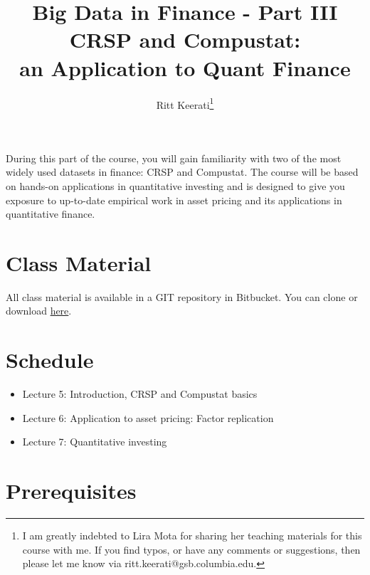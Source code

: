 \documentclass[12pts]{article}
\title{\textbf{Big Data in Finance - Part III} \\ \vspace{0.5cm} CRSP and Compustat: \\
	an Application to Quant Finance}
\author{Ritt Keerati\thanks{I am greatly indebted to Lira Mota for sharing her teaching materials for this course with me. If you find typos, or have any comments or suggestions, then please let me know via ritt.keerati@gsb.columbia.edu.}}
\begin{document}
\maketitle

During this part of the course, you will gain familiarity with two of the most widely used datasets in finance: CRSP and Compustat. The course will be based on hands-on applications in quantitative investing and is designed to give you exposure to up-to-date empirical work in asset pricing and its applications in quantitative finance.

\section*{Class Material}
All class material is available in a GIT repository in Bitbucket. You can clone or download \href{https://bitbucket.org/rkeerati/big-data-2022/src}{here}.

\section*{Schedule}

\begin{itemize}
	\item Lecture 5: Introduction, CRSP and Compustat basics
	\item Lecture 6: Application to asset pricing: Factor replication
	\item Lecture 7: Quantitative investing
\end{itemize}

\section*{Prerequisites}
\end{document}
